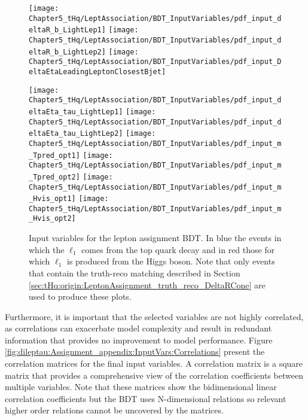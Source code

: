\begin{figure}[htbp!]
\centering
\texttt{[image: Chapter5\_tHq/LeptAssociation/BDT\_InputVariables/pdf\_input\_deltaR\_b\_LightLep1]}\quad
\texttt{[image: Chapter5\_tHq/LeptAssociation/BDT\_InputVariables/pdf\_input\_deltaR\_b\_LightLep2]}\quad
\texttt{[image: Chapter5\_tHq/LeptAssociation/BDT\_InputVariables/pdf\_input\_DeltaEtaLeadingLeptonClosestBjet]}

\medskip
\texttt{[image: Chapter5\_tHq/LeptAssociation/BDT\_InputVariables/pdf\_input\_deltaEta\_tau\_LightLep1]}\quad
\texttt{[image: Chapter5\_tHq/LeptAssociation/BDT\_InputVariables/pdf\_input\_deltaEta\_tau\_LightLep2]}\quad
\texttt{[image: Chapter5\_tHq/LeptAssociation/BDT\_InputVariables/pdf\_input\_m\_Tpred\_opt1]}
\medskip
\texttt{[image: Chapter5\_tHq/LeptAssociation/BDT\_InputVariables/pdf\_input\_m\_Tpred\_opt2]}\quad
\texttt{[image: Chapter5\_tHq/LeptAssociation/BDT\_InputVariables/pdf\_input\_m\_Hvis\_opt1]}\quad
\texttt{[image: Chapter5\_tHq/LeptAssociation/BDT\_InputVariables/pdf\_input\_m\_Hvis\_opt2]}
\caption{Input variables for the lepton assignment BDT. In blue the events in which the $\ell_{1}$ comes from the top quark decay
and in red those for which $\ell_{1}$ is produced from the Higgs boson. Note that only events that contain the truth-reco matching described 
in Section \ref{sec:tHq:origin:LeptonAssignment_truth_reco_DeltaRCone} are used to produce these plots.}
\label{fig:dileptau:Assignment_appendix:InputVars}
\end{figure}

Furthermore, it is important that the selected variables are not highly correlated, as correlations 
can exacerbate model complexity and result in redundant information that provides no improvement to model performance.
Figure \ref{fig:dileptau:Assignment_appendix:InputVars:Correlations} present the 
correlation matrices for the final input variables. A correlation matrix is a square 
matrix that provides a comprehensive view of the correlation coefficients between 
multiple variables. Note that these matrices show the bidimensional linear correlation coefficients
but the BDT uses N-dimensional relations so relevant higher order relations cannot be
uncovered by the matrices.

